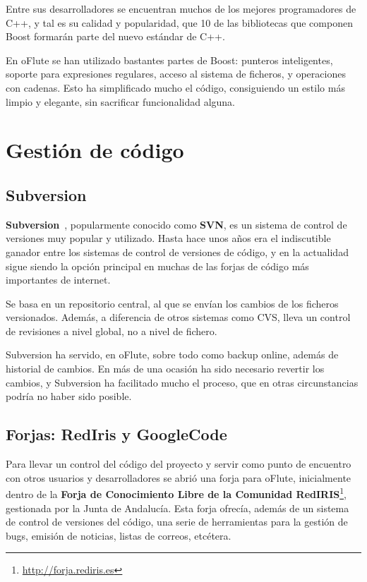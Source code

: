 Entre sus desarrolladores se encuentran muchos de los mejores programadores de
C++, y tal es su calidad y popularidad, que 10 de las bibliotecas que componen
Boost formarán parte del nuevo estándar de C++.

En oFlute se han utilizado bastantes partes de Boost: punteros inteligentes,
soporte para expresiones regulares, acceso al sistema de ficheros, y operaciones
con cadenas. Esto ha simplificado mucho el código, consiguiendo un estilo más
limpio y elegante, sin sacrificar funcionalidad alguna.

\section{Gestión de código}

\subsection{Subversion}
\textbf{Subversion}~\cite{refsubversion}, popularmente conocido como
\textbf{SVN}, es un sistema de control de versiones muy popular y
utilizado. Hasta hace unos años era el indiscutible ganador entre los sistemas
de control de versiones de código, y en la actualidad sigue siendo la opción
principal en muchas de las forjas de código más importantes de internet.

Se basa en un repositorio central, al que se envían los cambios de
los ficheros versionados. Además, a diferencia de otros sistemas como CVS, lleva
un control de revisiones a nivel global, no a nivel de fichero.

Subversion ha servido, en oFlute, sobre todo como backup online, además de
historial de cambios. En más de una ocasión ha sido necesario revertir los
cambios, y Subversion ha facilitado mucho el proceso, que en otras
circunstancias podría no haber sido posible.

\subsection{Forjas: RedIris y GoogleCode}
Para llevar un control del código del proyecto y servir como punto de encuentro
con otros usuarios y desarrolladores se abrió una forja para oFlute,
inicialmente dentro de la \textbf{Forja de Conocimiento Libre de la Comunidad
  RedIRIS}\footnote{\url{http://forja.rediris.es}}, gestionada por la Junta de
Andalucía. Esta forja ofrecía, además de un sistema de control de versiones del
código, una serie de herramientas para la gestión de bugs, emisión de noticias,
listas de correos, etcétera.

